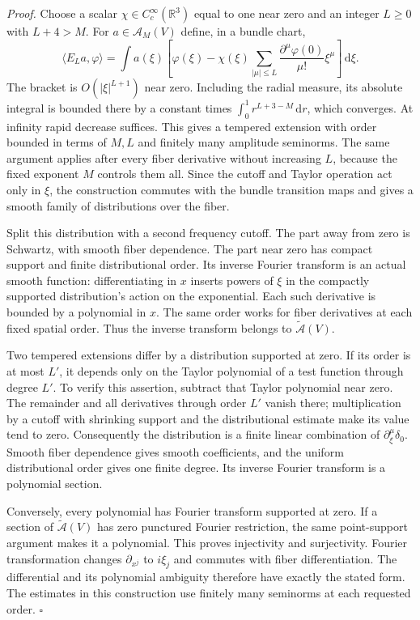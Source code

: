 \documentclass[
  english,
  11pt,
  reqno]{amsart}
\begin{document}
\emph{Proof.} Choose a scalar \(\chi\in C_c^\infty(\mathbb R^3)\) equal
to one near zero and an integer \(L\ge0\) with \(L+4>M\). For
\(a\in\mathscr A_M(V)\) define, in a bundle chart,%
 \[
\langle E_La,\varphi\rangle
=\int a(\xi)\left[
\varphi(\xi)-\chi(\xi)
\sum_{|\mu|\le L}\frac{\partial^\mu\varphi(0)}{\mu!}\xi^\mu
\right]\,\mathrm d\xi.
\] The bracket is \(O(|\xi|^{L+1})\) near zero. Including the radial
measure, its absolute integral is bounded there by a constant times
\(\int_0^1r^{L+3-M}\,\mathrm dr\), which converges. At infinity rapid
decrease suffices. This gives a tempered extension with order bounded in
terms of \(M,L\) and finitely many amplitude seminorms. The same
argument applies after every fiber derivative without increasing \(L\),
because the fixed exponent \(M\) controls them all. Since the cutoff and
Taylor operation act only in \(\xi\), the construction commutes with the
bundle transition maps and gives a smooth family of distributions over
the fiber.

Split this distribution with a second frequency cutoff. The part away
from zero is Schwartz, with smooth fiber dependence. The part near zero
has compact support and finite distributional order. Its inverse Fourier
transform is an actual smooth function: differentiating in \(x\) inserts
powers of \(\xi\) in the compactly supported distribution's action on
the exponential. Each such derivative is bounded by a polynomial in
\(x\). The same order works for fiber derivatives at each fixed spatial
order. Thus the inverse transform belongs to
\(\widetilde{\mathscr A}(V)\).

Two tempered extensions differ by a distribution supported at zero. If
its order is at most \(L'\), it depends only on the Taylor polynomial of
a test function through degree \(L'\). To verify this assertion,
subtract that Taylor polynomial near zero. The remainder and all
derivatives through order \(L'\) vanish there; multiplication by a
cutoff with shrinking support and the distributional estimate make its
value tend to zero. Consequently the distribution is a finite linear
combination of \(\partial_\xi^\mu\delta_0\). Smooth fiber dependence
gives smooth coefficients, and the uniform distributional order gives
one finite degree. Its inverse Fourier transform is a polynomial
section.

Conversely, every polynomial has Fourier transform supported at zero. If
a section of \(\widetilde{\mathscr A}(V)\) has zero punctured Fourier
restriction, the same point-support argument makes it a polynomial. This
proves injectivity and surjectivity. Fourier transformation changes
\(\partial_{x^j}\) to \(i\xi_j\) and commutes with fiber
differentiation. The differential and its polynomial ambiguity therefore
have exactly the stated form. The estimates in this construction use
finitely many seminorms at each requested order. \hfill\(\square\)
\end{document}
